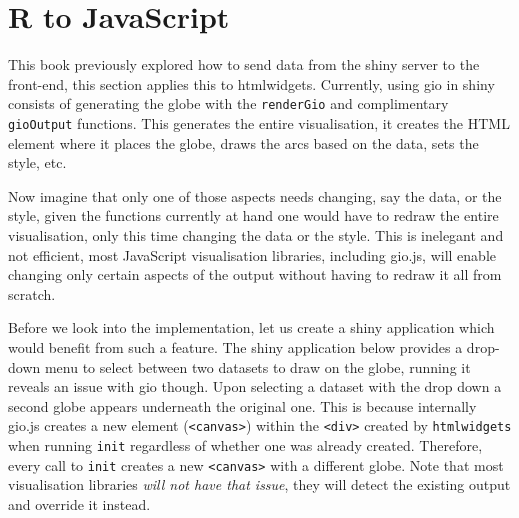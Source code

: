 \documentclass[
]{krantz}
\begin{document}
\hypertarget{r-to-javascript}{%
\section*{R to JavaScript}\label{r-to-javascript}}


This book previously explored how to send data from the shiny server to the front-end, this section applies this to htmlwidgets. Currently, using gio in shiny consists of generating the globe with the \texttt{renderGio} and complimentary \texttt{gioOutput} functions. This generates the entire visualisation, it creates the HTML element where it places the globe, draws the arcs based on the data, sets the style, etc.

Now imagine that only one of those aspects needs changing, say the data, or the style, given the functions currently at hand one would have to redraw the entire visualisation, only this time changing the data or the style. This is inelegant and not efficient, most JavaScript visualisation libraries, including gio.js, will enable changing only certain aspects of the output without having to redraw it all from scratch.

Before we look into the implementation, let us create a shiny application which would benefit from such a feature. The shiny application below provides a drop-down menu to select between two datasets to draw on the globe, running it reveals an issue with gio though. Upon selecting a dataset with the drop down a second globe appears underneath the original one. This is because internally gio.js creates a new element (\texttt{\textless{}canvas\textgreater{}}) within the \texttt{\textless{}div\textgreater{}} created by \texttt{htmlwidgets} when running \texttt{init} regardless of whether one was already created. Therefore, every call to \texttt{init} creates a new \texttt{\textless{}canvas\textgreater{}} with a different globe. Note that most visualisation libraries \emph{will not have that issue}, they will detect the existing output and override it instead.
\end{document}
